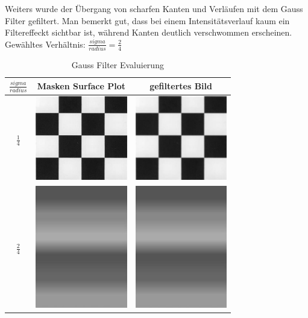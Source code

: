 \documentclass[12pt,german]{article}
\begin{document}
Weiters wurde der Übergang von scharfen Kanten und Verläufen mit dem Gauss Filter gefiltert. Man bemerkt gut, dass bei einem Intensitätsverlauf kaum ein Filtereffeckt sichtbar ist, während Kanten deutlich verschwommen erscheinen. Gewähltes Verhältnis: $ \frac{sigma}{radius} = \frac{2}{4} $
\begin{table}[H]
  \centering
  \begin{tabular}{| c | c | c |}
    \hline
    $ \frac{sigma}{radius} $ & Masken Surface Plot & gefiltertes Bild \\
    \hline
    $ \frac{1}{4} $ &
	\includegraphics[width=4cm]{../testData/Gauss/Schachbrett.jpg} & 	\includegraphics[width=4cm]{../testData/Gauss/SchachbrettR4S2.jpg} \\
	    \hline
    $ \frac{2}{4} $ &
	\includegraphics[width=4cm]{../testData/Gauss/Regenbogen.jpg} & 	\includegraphics[width=4cm]{../testData/Gauss/RegenbogenR4S2.jpg} \\
  \end{tabular}
  \caption{Gauss Filter Evaluierung}
  \label{tab:GaussFilterEvaluierung}
\end{table}
\end{document}
